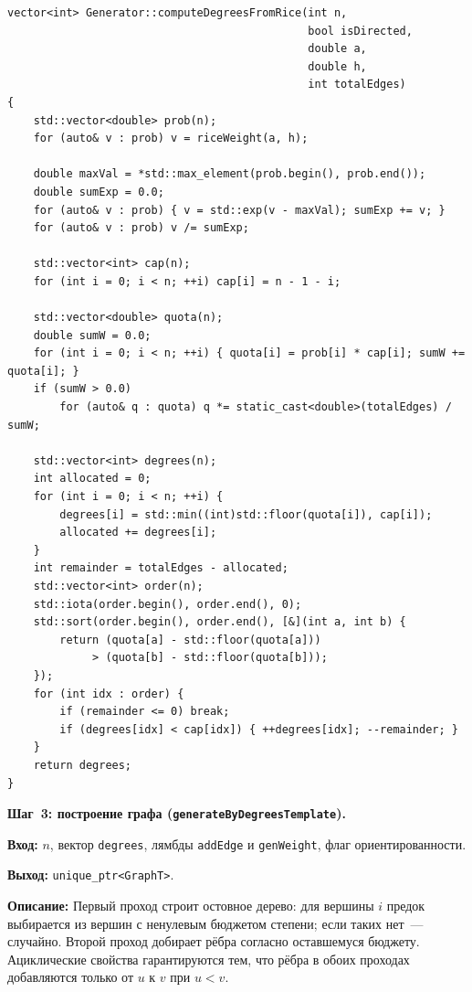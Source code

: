 \begin{lstlisting}[style=cppstyle, caption={Вычисление целевых степеней (Generator.cc)}]
vector<int> Generator::computeDegreesFromRice(int n, 
                                              bool isDirected, 
                                              double a, 
                                              double h, 
                                              int totalEdges)
{
    std::vector<double> prob(n);
    for (auto& v : prob) v = riceWeight(a, h);

    double maxVal = *std::max_element(prob.begin(), prob.end());
    double sumExp = 0.0;
    for (auto& v : prob) { v = std::exp(v - maxVal); sumExp += v; }
    for (auto& v : prob) v /= sumExp;

    std::vector<int> cap(n);
    for (int i = 0; i < n; ++i) cap[i] = n - 1 - i;

    std::vector<double> quota(n);
    double sumW = 0.0;
    for (int i = 0; i < n; ++i) { quota[i] = prob[i] * cap[i]; sumW += quota[i]; }
    if (sumW > 0.0)
        for (auto& q : quota) q *= static_cast<double>(totalEdges) / sumW;

    std::vector<int> degrees(n);
    int allocated = 0;
    for (int i = 0; i < n; ++i) {
        degrees[i] = std::min((int)std::floor(quota[i]), cap[i]);
        allocated += degrees[i];
    }
    int remainder = totalEdges - allocated;
    std::vector<int> order(n);
    std::iota(order.begin(), order.end(), 0);
    std::sort(order.begin(), order.end(), [&](int a, int b) {
        return (quota[a] - std::floor(quota[a]))
             > (quota[b] - std::floor(quota[b]));
    });
    for (int idx : order) {
        if (remainder <= 0) break;
        if (degrees[idx] < cap[idx]) { ++degrees[idx]; --remainder; }
    }
    return degrees;
}
\end{lstlisting}

\textbf{Шаг~3: построение графа (\texttt{generateByDegreesTemplate}).}

\textbf{Вход:} $n$, вектор \texttt{degrees}, лямбды \texttt{addEdge}
и \texttt{genWeight}, флаг ориентированности.

\textbf{Выход:} \texttt{unique\_ptr<GraphT>}.

\textbf{Описание:} Первый проход строит остовное дерево: для вершины $i$
предок выбирается из вершин с ненулевым бюджетом степени; если таких нет~---
случайно. Второй проход добирает рёбра согласно оставшемуся бюджету.
Ациклические свойства гарантируются тем, что рёбра в обоих проходах
добавляются только от $u$ к $v$ при $u < v$.

